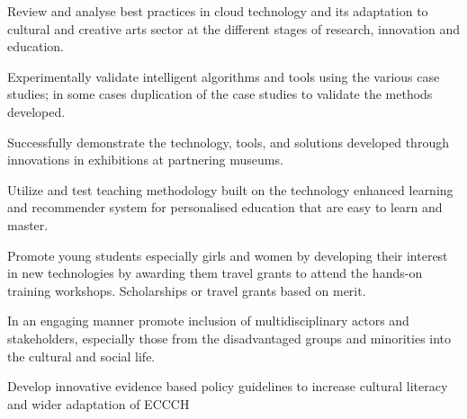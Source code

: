 \item Review and analyse best practices in cloud technology and its adaptation to cultural and creative arts sector at the different stages of research, innovation and  education.
\item Experimentally validate intelligent algorithms and tools using the various case studies; in some cases duplication of the case studies to validate the methods developed.
\item Successfully demonstrate the technology, tools, and solutions developed through innovations in exhibitions at partnering museums.
\item Utilize and test teaching methodology built on the technology enhanced learning and recommender system for personalised education that are easy to learn and master.
\item Promote young students especially girls and women by developing their interest in new technologies by awarding them travel grants to attend the hands-on training workshops. Scholarships or travel grants based on merit.
\item In an engaging manner promote inclusion of multidisciplinary actors and stakeholders, especially those from the disadvantaged groups and minorities into the cultural and social life.
\item Develop innovative evidence based policy guidelines to increase cultural literacy and wider adaptation of ECCCH
